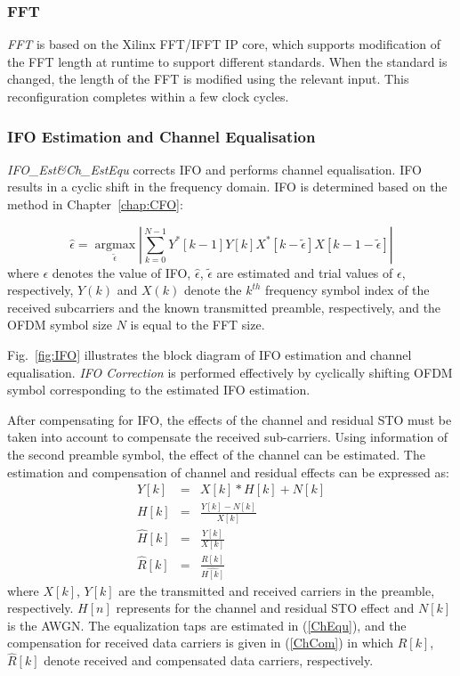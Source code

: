 \subsubsection{FFT}
\emph{FFT} is based on the Xilinx FFT/IFFT IP core, which supports modification of the FFT length at runtime to support different standards. When the standard is changed, the length of the FFT is modified using the relevant input. This reconfiguration completes within a few clock cycles.

\subsubsection{IFO Estimation and Channel Equalisation}
\emph{IFO\_Est\&Ch\_EstEqu} corrects IFO and performs channel equalisation.
IFO results in a cyclic shift in the frequency domain.
IFO is determined based on the method in Chapter~\ref{chap:CFO}:

\begin{equation}
\label{integerCFO}
\hat{\epsilon} =\underset{\tilde{\epsilon}}{\operatorname{argmax}}  \left|\sum_{k=0}^{N-1} Y^{*}[k-1] Y[k]  X^{*}[k-\tilde{\epsilon}]  X[k-1-\tilde{\epsilon}]\right|
\end{equation}
where $\epsilon$ denotes the value of IFO, $\hat{\epsilon}$, $\tilde{\epsilon}$ are estimated and trial values of $\epsilon$, respectively,
$Y(k)$ and $X(k)$ denote the $k^{th}$ frequency symbol index of the received subcarriers and the known transmitted preamble, respectively, and the OFDM symbol size $N$ is equal to the FFT size.

Fig.~\ref{fig:IFO} illustrates the block diagram of IFO estimation and channel equalisation.
\emph{IFO Correction} is performed effectively by cyclically shifting OFDM symbol corresponding to the estimated IFO estimation.

After compensating for IFO, the effects of the channel and residual STO must be taken into account to compensate the received sub-carriers.
Using information of the second preamble symbol, the effect of the channel can be estimated.
The estimation and compensation of channel and residual effects can be expressed as:
\begin{eqnarray}
\label{ChEqu}
Y[k] &=& X[k] * H[k] + N[k] \nonumber \\
H[k] &=& \frac{Y[k]-N[k]}{X[k]} \nonumber \\
\hat{H}[k] &=& \frac{Y[k]}{X[k]}\\
\label{ChCom}
\hat{R}[k] &=& \frac{R[k]}{\hat{H[k]}}
\end{eqnarray}
where $X[k]$, $Y[k]$ are the transmitted and received carriers in the preamble, respectively.
$H[n]$ represents for the channel and residual STO effect and $N[k]$ is the AWGN.
The equalization taps are estimated in (\ref{ChEqu}), and the compensation for received data carriers is given in (\ref{ChCom})
in which $R[k]$, $\hat{R}[k]$ denote received and compensated data carriers, respectively.


